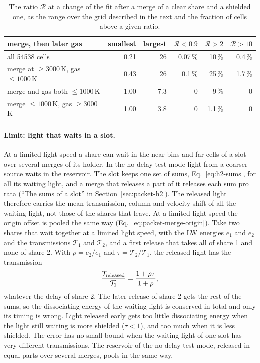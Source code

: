 \begin{table}[htbp]
\centering
\caption{The ratio $\mathcal R$ at a change of the fit after a merge of a clear
share and a shielded one, as the range over the grid described in the text and
the fraction of cells above a given ratio.}
\label{tab:h2-fitchange}
\begin{tabular}{lrrrrr}
\toprule
merge, then later gas & smallest & largest & $\mathcal R<0.9$ & $\mathcal R>2$ & $\mathcal R>10$ \\
\midrule
all 54538 cells & 0.21 & 26 & 0.07\,\% & 10\,\% & 0.4\,\% \\
merge at $\ge3000$\,K, gas $\le1000$\,K & 0.43 & 26 & 0.1\,\% & 25\,\% & 1.7\,\% \\
merge and gas both $\le1000$\,K & 1.00 & 7.3 & 0 & 9\,\% & 0 \\
merge $\le1000$\,K, gas $\ge3000$\,K & 1.00 & 3.8 & 0 & 1.1\,\% & 0 \\
\bottomrule
\end{tabular}
\end{table}

\paragraph{Limit: light that waits in a slot.} At a limited light speed a
share can wait in the near bins and far cells of a slot over several merges of
its holder. In the no-delay test mode light from a coarser source waits in the
reservoir. The slot keeps one set of sums, Eq.~\eqref{eq:h2-sums}, for all its
waiting light, and a merge that releases a part of it releases each sum pro
rata (``The sums of a slot'' in Section~\ref{sec:packet-h2}). The released
light therefore carries the mean transmission, column and velocity shift of all
the waiting light, not those of the shares that leave. At a limited light speed
the origin offset is pooled the same way
(Eq.~\eqref{eq:packet-merge-origin}). Take two shares that wait together at a
limited light speed, with the LW energies $e_1$ and $e_2$ and the
transmissions $\mathcal T_1$ and $\mathcal T_2$, and a first release that
takes all of share 1 and none of share 2. With $\rho=e_2/e_1$ and
$\tau=\mathcal T_2/\mathcal T_1$, the released light has the transmission
\begin{equation}
  \frac{\mathcal T_{\rm released}}{\mathcal T_1}=\frac{1+\rho\tau}{1+\rho},
  \label{eq:h2-wait-pool}
\end{equation}
whatever the delay of share 2. The later release of share 2 gets the rest of
the sums, so the dissociating energy of the waiting light is conserved in
total and only its timing is wrong. Light released early gets too little
dissociating energy when the light still waiting is more shielded
($\tau<1$), and too much when it is less shielded. The error has no small
bound when the waiting light of one slot has very different transmissions.
The reservoir of the no-delay test mode, released in equal parts over several
merges, pools in the same way.

